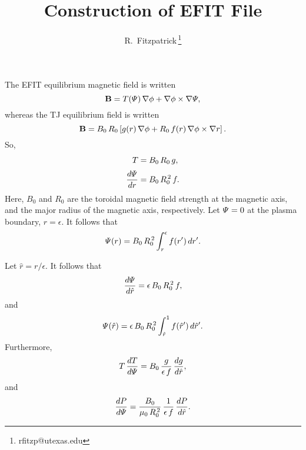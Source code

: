 \documentclass[12pt,prb,aps,notitlepage]{revtex4-1}
\begin{document}
\title{Construction of EFIT File}
\author{R.~Fitzpatrick\,\footnote{rfitzp@utexas.edu}}
\begin{abstract}
\end{abstract}
\maketitle

The EFIT equilibrium magnetic field is written
\begin{equation}
{\bf B} = T({\mit\Psi})\,\nabla\phi + \nabla\phi\times \nabla{\mit\Psi},
\end{equation}
whereas the TJ equilibrium field is written
\begin{equation}
{\bf B} = B_0\,R_0\left[g(r)\,\nabla\phi+R_0\,f(r)\,\nabla\phi\times\nabla r\right].
\end{equation}
So,
\begin{align}
T &= B_0\,R_0\,g,\\[0.5ex]
\frac{d{\mit\Psi}}{dr} &= B_0\,R_0^{\,2}\,f.
\end{align}
Here, $B_0$ and $R_0$ are the toroidal magnetic field strength at the magnetic axis, and the major radius of the 
magnetic axis, respectively. Let ${\mit\Psi}=0$ at the plasma boundary, $r=\epsilon$. It follows that
\begin{equation}
{\mit\Psi}(r) = B_0\,R_0^{\,2}\int_r^\epsilon f(r')\,dr'.
\end{equation}

Let $\hat{r}=r/\epsilon$. It follows that
\begin{equation}
\frac{d{\mit\Psi}}{d\hat{r}} = \epsilon\,B_0\,R_0^{\,2}\,f,
\end{equation}
and
\begin{equation}
{\mit\Psi}(\hat{r}) = \epsilon\,B_0\,R_0^{\,2}\int_{\hat{r}}^1 f(\hat{r}')\,d\hat{r}'.
\end{equation}
Furthermore,
\begin{equation}
T\,\frac{dT}{d{\mit\Psi}}= B_0\,\frac{g}{\epsilon\,f}\,\frac{dg}{d\hat{r}},
\end{equation}
and
\begin{equation}
\frac{dP}{d{\mit\Psi}}= \frac{B_0}{\mu_0\,R_0^{\,2}}\,\frac{1}{\epsilon\,f}\,\frac{dP}{d\hat{r}}.
\end{equation}
\end{document}
